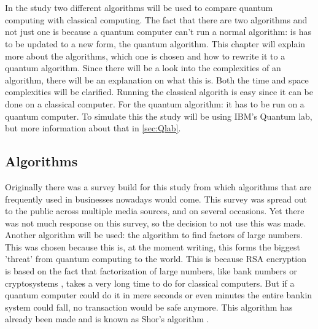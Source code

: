 
\chapter{}
\label{ch:methodologie}


In the study two different algorithms will be used to compare quantum computing with classical computing. 
The fact that there are two algorithms and not just one is because a quantum computer can't run a normal algorithm: is has to be updated to a new form, the quantum algorithm.
This chapter will explain more about the algorithms, which one is chosen and how to rewrite it to a quantum algorithm. Since there will be a look into the complexities of an algorithm, there will be an explanation on what this is.
Both the time and space complexities will be clarified. Running the classical algorith is easy since it can be done on a classical computer. For the quantum algorithm: it has to be run on a quantum computer.
To simulate this the study will be using IBM's Quantum lab, but more information about that in \ref{sec:Qlab}.
\section{Algorithms}
Originally there was a survey build for this study from which algorithms that are frequently used in businesses nowadays would come. This survey was spread out to the public across multiple media sources, and on several occasions.
Yet there was not much response on this survey, so the decision to not use this was made. Another algorithm will be used: the algorithm to find factors of large numbers. This was chosen because this is, at the moment writing, this forms the biggest 'threat' from quantum computing to the world.
This is because RSA encryption is based on the fact that factorization of large numbers, like bank numbers or cryptosystems \autocite{Shor}, takes a very long time to do for classical computers. But if a quantum computer could do it in mere seconds or even minutes the entire bankin system could fall, no transaction would be safe anymore.
This algorithm has already been made and is known as Shor's algorithm \autocite{Shor}.
